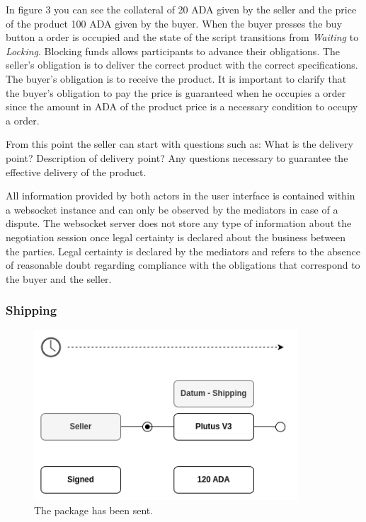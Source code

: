\documentclass[12pt]{article}
\begin{document}
In figure 3 you can see the collateral of 20 ADA given by the seller and the price of the product 100 ADA given by the buyer.
When the buyer presses the buy button a order is occupied and the state of the script transitions from \emph{Waiting} to \emph{Locking}.
Blocking funds allows participants to advance their obligations.
The seller's obligation is to deliver the correct product with the correct specifications. The buyer's obligation is to receive the product.
It is important to clarify that the buyer's obligation to pay the price is guaranteed when he occupies a order since the amount in ADA of the product price is a necessary condition to occupy a order.

From this point the seller can start with questions such as: What is the delivery point? Description of delivery point? Any questions necessary to guarantee the effective delivery of the product.

All information provided by both actors in the user interface is contained within a websocket instance and can only be observed by the mediators in case of a dispute.
The websocket server does not store any type of information about the negotiation session once legal certainty is declared about the business between the parties.
Legal certainty is declared by the mediators and refers to the absence of reasonable doubt regarding compliance with the obligations that correspond to the buyer and the seller.


\subsubsection { Shipping }


\begin{figure}[ht]
  \centering
  \includegraphics[width=0.88\textwidth, keepaspectratio]{3.png}
  \caption{The package has been sent.}  
  \label{fig:delivered}
\end{figure}
\end{document}
